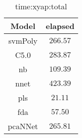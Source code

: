 \begin{table}[!ht]
	\centering
	\begin{tabular}{|c|c|}
		\hline
		Model & elapsed \\ \hline
		svmPoly & $266.57$ \\ \hline
		C5.0 & $283.87$ \\ \hline
		nb & $109.39$ \\ \hline
		nnet & $423.39$ \\ \hline
		pls & $21.11$ \\ \hline
		fda & $57.50$ \\ \hline
		pcaNNet & $265.81$ \\ \hline
	\end{tabular}
	\caption{time:xyap:total}
	\label{tab:time:xyap:total}
\end{table}

